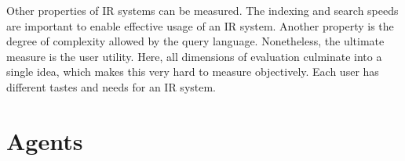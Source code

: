 \documentclass[../main.tex]{subfiles}
\begin{document}

Other properties of IR systems can be measured.
The indexing and search speeds are important to enable effective usage of an IR system.
Another property is the degree of complexity allowed by the query language.
Nonetheless, the ultimate measure is the user utility.
Here, all dimensions of evaluation culminate into a single idea,
which makes this very hard to measure objectively.
Each user has different tastes and needs for an IR system.

\section{Agents}
\label{sec:agents}
\end{document}
